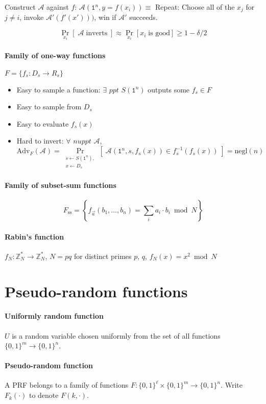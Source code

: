 \documentclass[11pt]{article}
\newcommand{\eqdef}{\ensuremath{\equiv}}
\newcommand{\ZZ}{\ensuremath{\mathds{Z}}}
\newcommand{\Adv}{\text{Adv}}
\newcommand{\nuppt}{\textit{nuppt}}
\newcommand{\negl}{\text{negl}}
\newcommand{\AAA}{\ensuremath{\mathcal{A}}}
\theoremstyle{remark}
\begin{document}
Construct $\AAA$ against $f$:
$\AAA(\texttt{1}^n, y=f(x_i))\eqdef$ Repeat: Choose all of the $x_j$ for $j \neq i$,
invoke $\AAA'(f'(x')))$, win if $\AAA'$ succeeds.

\[ \Pr_{x_i}[\;\AAA \; \text{inverts}\;] \approx \Pr_{x_i}[x_i\;\text{is good}] \ge 1-\delta/2 \]

\paragraph{Family of one-way functions}
$F = \{ f_s : D_s \rightarrow R_s \}$
\begin{itemize}
\item Easy to sample a function: $\exists$ $ppt$ $S(\texttt{1}^n)$ outputs some $f_s \in F$
\item Easy to sample from $D_s$
\item Easy to evaluate $f_s(x)$
\item Hard to invert: $\forall$ $\nuppt$ $\AAA$,
\[ \Adv_F(\AAA) = \Pr_{\substack{s\gets S(\texttt{1}^n),\\x\gets D_s}} [\;
  \AAA(\texttt{1}^n, s, f_s(x)) \in f_s^{-1}(f_s(x))
\;] = \negl(n) \]
\end{itemize}

\paragraph{Family of subset-sum functions}
\[F_{\text{ss}} = \left\{ f_{\vec{a}}(b_1,\ldots,b_n) = \sum_i a_i\cdot b_i \bmod N \right\} \]

\paragraph{Rabin's function}
$f_N : \ZZ_N^* \rightarrow \ZZ_N^*$,
$N=pq$ for distinct primes $p$, $q$,
$f_N(x)=x^2 \bmod N$

\section{Pseudo-random functions}

\paragraph{Uniformly random function}
$U$ is a random variable chosen uniformly from the set of all functions
$\{0,1\}^m \rightarrow \{0,1\}^n$.

\paragraph{Pseudo-random function}
A PRF belongs to a family of functions
$F : \{0,1\}^\ell \times \{0,1\}^m \rightarrow \{0,1\}^n$.
Write $F_k(\cdot)$ to denote $F(k, \cdot)$.
\end{document}
